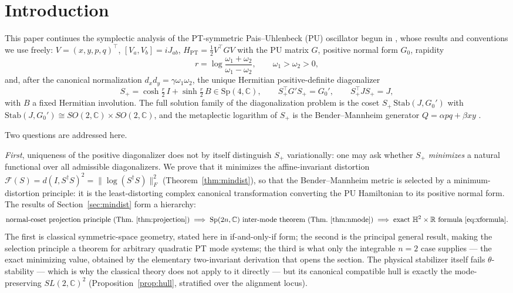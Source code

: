 \documentclass[11pt]{article}
\theoremstyle{definition}
\theoremstyle{remark}
\newcommand{\C}{\mathbb{C}}
\newcommand{\R}{\mathbb{R}}
\newcommand{\w}{\omega}
\newcommand{\Sp}{\mathrm{Sp}}
\newcommand{\Stab}{\mathrm{Stab}}
\newcommand{\dg}{\dagger}
\begin{document}
\section{Introduction}\label{sec:intro}

This paper continues the symplectic analysis of the PT-symmetric
Pais--Uhlenbeck (PU) oscillator begun in \cite{companion}, whose results and
conventions we use freely: $V=(x,y,p,q)^{\top}$, $[V_a,V_b]=iJ_{ab}$,
$H_{\mathrm{PT}}=\tfrac12V^{\top}GV$ with the PU matrix $G$, positive normal
form $G_0$, rapidity
\begin{equation}
r=\log\frac{\w_1+\w_2}{\w_1-\w_2},\qquad \w_1>\w_2>0,
\end{equation}
and, after the canonical normalization $d_xd_y=\gamma\w_1\w_2$, the unique
Hermitian positive-definite diagonalizer
\begin{equation}
S_+=\cosh\tfrac r2\,I+\sinh\tfrac r2\,B\in\Sp(4,\C),
\qquad
S_+^{\top}G'S_+=G_0',\qquad S_+^{\top}JS_+=J,
\end{equation}
with $B$ a fixed Hermitian involution.  The full solution family of the
diagonalization problem is the coset $S_+\,\Stab(J,G_0')$ with
$\Stab(J,G_0')\cong SO(2,\C)\times SO(2,\C)$, and the metaplectic logarithm
of $S_+$ is the Bender--Mannheim generator $Q=\alpha pq+\beta xy$
\cite{BM2008PRL,BM2008PRD,companion}.

Two questions are addressed here.

\emph{First}, uniqueness of the positive diagonalizer does not by itself
distinguish $S_+$ variationally: one may ask whether $S_+$ \emph{minimizes} a
natural functional over all admissible diagonalizers.  We prove that it
minimizes the affine-invariant distortion
$\mathcal F(S)=d(I,S^{\dg}S)^2=\|\log(S^{\dg}S)\|_F^2$
(Theorem~\ref{thm:mindist}), so that the Bender--Mannheim metric is selected
by a minimum-distortion principle: it is the least-distorting complex
canonical transformation converting the PU Hamiltonian to its positive
normal form.  The results of Section~\ref{sec:mindist} form a hierarchy:
\begin{equation*}
\text{normal-coset projection principle (Thm.~\ref{thm:projection})}
\;\Longrightarrow\;
\Sp(2n,\C)\ \text{inter-mode theorem (Thm.~\ref{thm:nmode})}
\;\Longrightarrow\;
\text{exact }\mathbb H^2\times\R\ \text{formula \eqref{eq:xformula}} .
\end{equation*}
The first is classical symmetric-space geometry, stated here in
if-and-only-if form; the second is the principal general result, making the
selection principle a theorem for arbitrary quadratic PT mode systems; the
third is what only the integrable $n=2$ case supplies --- the exact
minimizing value, obtained by the elementary two-invariant derivation that
opens the section.  The physical stabilizer itself fails
$\theta$-stability --- which is why the classical theory does not apply to
it directly --- but its canonical compatible hull is exactly the
mode-preserving $SL(2,\C)^2$ (Proposition~\ref{prop:hull}, stratified over
the alignment locus).
\end{document}
